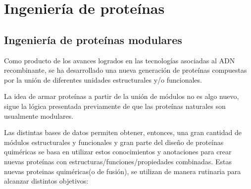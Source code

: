 %             
       
\section{Ingeniería de proteínas}\label{proteinEngineering}
\subsection{Ingeniería de proteínas modulares}    


Como producto de los avances logrados en las tecnologías asociadas al ADN recombinante, se ha desarrollado una nueva generación de proteínas compuestas por la unión de diferentes unidades estructurales y/o funcionales.


La idea de armar proteínas a partir de la unión de módulos no es algo nuevo, sigue la lógica presentada previamente de que las proteínas naturales son usualmente modulares.


Las distintas bases de datos permiten obtener, entonces, una gran cantidad de módulos estructurales y funcionales y gran 
parte del diseño de proteínas quiméricas se basa en utilizar estos conocimientos y anotaciones para crear nuevas proteínas con estructuras/funciones/propiedades combinadas.
Estas nuevas proteinas quiméricas(o de fusión), se utilizan de manera rutinaria para alcanzar distintos objetivos:

